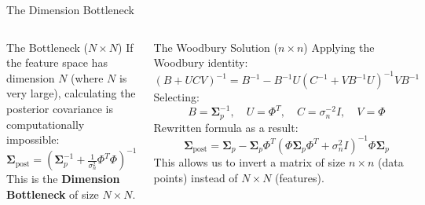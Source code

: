 \documentclass[aspectratio=169, 10pt,handout]{beamer}
\newcommand{\bSigma}{\boldsymbol{\Sigma}}
\newcommand{\sn}{\sigma_n^2}
\begin{document}
\begin{frame}{The Dimension Bottleneck}

  \begin{columns}[T]
      \begin{block}{The Bottleneck ($N \times N$)}
        \footnotesize
        If the feature space has dimension $N$ (where $N$ is very large), calculating the posterior covariance is computationally impossible:
        \[
          \bSigma_{\text{post}} = \left(\bSigma_p^{-1}+\tfrac{1}{\sn}\Phi^T\Phi\right)^{-1}
        \]
        This is the \alert{\textbf{Dimension Bottleneck}} of size $N\times N$.
      \end{block}

      \begin{block}{The Woodbury Solution ($n \times n$)}
        \scriptsize
        Applying the Woodbury identity:
        \[
          (B + U C V)^{-1} = B^{-1} - B^{-1} U (C^{-1} + V B^{-1} U)^{-1} V B^{-1}
        \]
        Selecting:
        \[
          B = \bSigma_p^{-1}, \quad U = \Phi^T, \quad C = \sigma_n^{-2} I, \quad V = \Phi
        \]
        Rewritten formula as a result:
        \[
          \bSigma_{\text{post}} = \bSigma_p - \bSigma_p\Phi^T\left(\Phi\bSigma_p\Phi^T + \sn I\right)^{-1}\Phi\bSigma_p
        \]
        This allows us to invert a matrix of size $n\times n$ (data points) instead of $N\times N$ (features).
      \end{block}
  \end{columns}

\end{frame}
\end{document}

